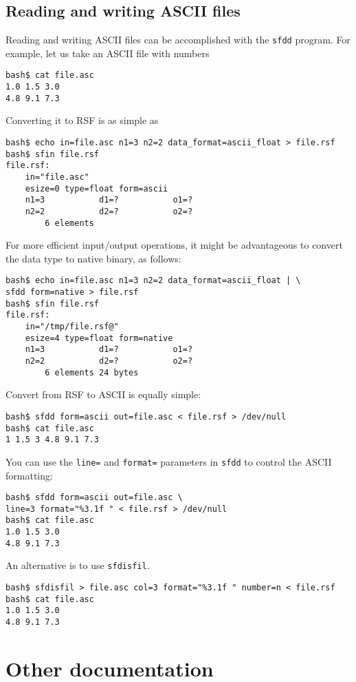 \subsection{Reading and writing ASCII files}

Reading and writing ASCII files can be accomplished with the \texttt{sfdd}
program. For example, let us take an ASCII file with numbers
\begin{verbatim}
bash$ cat file.asc
1.0 1.5 3.0
4.8 9.1 7.3
\end{verbatim}
Converting it to RSF is as simple as
\begin{verbatim}
bash$ echo in=file.asc n1=3 n2=2 data_format=ascii_float > file.rsf
bash$ sfin file.rsf
file.rsf:
    in="file.asc"
    esize=0 type=float form=ascii
    n1=3           d1=?           o1=?
    n2=2           d2=?           o2=?
        6 elements
\end{verbatim}
For more efficient input/output operations, it might be advantageous to
convert the data type to native binary, as follows:
\begin{verbatim}
bash$ echo in=file.asc n1=3 n2=2 data_format=ascii_float | \
sfdd form=native > file.rsf
bash$ sfin file.rsf
file.rsf:
    in="/tmp/file.rsf@"
    esize=4 type=float form=native
    n1=3           d1=?           o1=?
    n2=2           d2=?           o2=?
        6 elements 24 bytes
\end{verbatim}

Convert from RSF to ASCII is equally simple:
\begin{verbatim}
bash$ sfdd form=ascii out=file.asc < file.rsf > /dev/null
bash$ cat file.asc
1 1.5 3 4.8 9.1 7.3
\end{verbatim}
You can use the \texttt{line=} and \texttt{format=} parameters in
\texttt{sfdd} to control the ASCII formatting:
\begin{verbatim}
bash$ sfdd form=ascii out=file.asc \
line=3 format="%3.1f " < file.rsf > /dev/null
bash$ cat file.asc
1.0 1.5 3.0
4.8 9.1 7.3
\end{verbatim}
An alternative is to use \texttt{sfdisfil}.
\begin{verbatim}
bash$ sfdisfil > file.asc col=3 format="%3.1f " number=n < file.rsf
bash$ cat file.asc
1.0 1.5 3.0
4.8 9.1 7.3
\end{verbatim}

\section{Other documentation}

